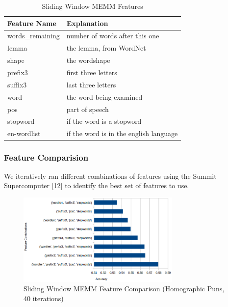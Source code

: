 \documentclass{article}
\begin{document}
\begin{table}
\caption{Sliding Window MEMM Features}\label{tab:memm_features} 
\begin{center}
\begin{tabular}{l l} 
\toprule
\textbf{Feature Name} & \textbf{Explanation} \\
\midrule
words\_remaining & number of words after this one \\
lemma            & the lemma, from WordNet \\
shape            & the wordshape \\
prefix3          & first three letters \\
suffix3          & last three letters \\
word             & the word being examined \\
pos              & part of speech \\
stopword         & if the word is a stopword \\
en-wordlist      & if the word is in the english language \\
\bottomrule
\end{tabular}
\end{center}
\end{table}

\subsubsection{Feature Comparision}

We iteratively ran different combinations of features using the Summit
Supercomputer [12] to identify the best set of features to use. 

\begin{figure}[h!]
    \centering
    \includegraphics[width=8cm]{figures/sliding_window_homographic.png}
	\caption{Sliding Window MEMM Feature Comparison (Homographic Puns, 40 iterations)}
    \label{fig:method}
\end{figure}
\end{document}
